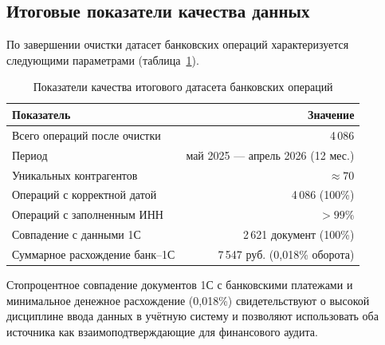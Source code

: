 \subsection*{Итоговые показатели качества данных}

По завершении очистки датасет банковских операций характеризуется следующими параметрами (таблица~\ref{tab:data_quality}).

\begin{table}[H]
\centering
\caption{Показатели качества итогового датасета банковских операций}
\label{tab:data_quality}
\begin{tabular}{lr}
\toprule
\textbf{Показатель} & \textbf{Значение} \\
\midrule
Всего операций после очистки & 4\,086 \\
Период & май 2025 --- апрель 2026 (12 мес.) \\
Уникальных контрагентов & $\approx 70$ \\
Операций с корректной датой & 4\,086 (100\%) \\
Операций с заполненным ИНН & $> 99\%$ \\
Совпадение с данными 1С & 2\,621 документ (100\%) \\
Суммарное расхождение банк--1С & 7\,547 руб. (0,018\% оборота) \\
\bottomrule
\end{tabular}
\end{table}

Стопроцентное совпадение документов 1С с банковскими платежами и минимальное денежное расхождение (0,018\%) свидетельствуют о высокой дисциплине ввода данных в учётную систему и позволяют использовать оба источника как взаимоподтверждающие для финансового аудита.
